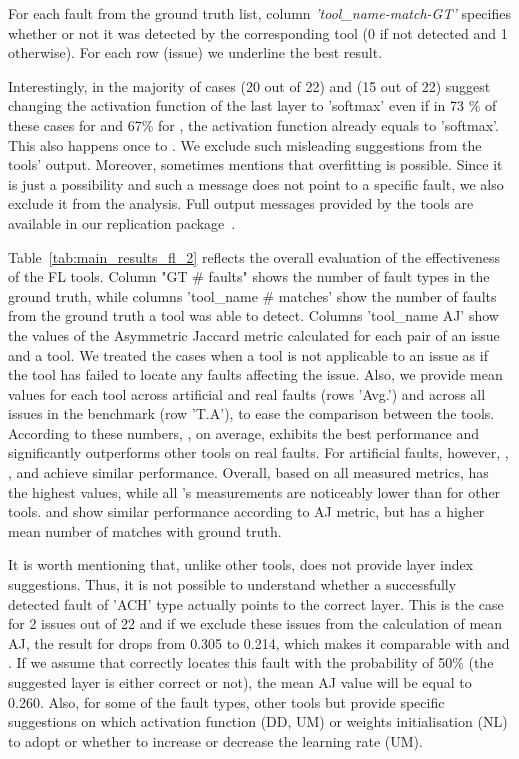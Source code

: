 For each fault from the ground truth list, column \textit{'tool\_name-match-GT'} specifies whether or not it was detected by the corresponding tool (0 if not detected and 1 otherwise). For each row (issue) we underline the best result.

Interestingly, in the majority of cases \UM (20 out of 22) and \DD (15 out of 22) suggest changing the activation function of the last layer to 'softmax' even if in 73 \% of these cases for \UM and 67\% for \DD, the activation function already equals to 'softmax'. This also happens once to \NL. We exclude such misleading suggestions from the tools' output. Moreover, sometimes \UM mentions that overfitting is possible. Since it is just a possibility and such a message does not point to a specific fault, we also exclude it from the analysis. Full output messages provided by the tools are available in our replication package~\cite{fl_comparison_replication}.

Table~\ref{tab:main_results_fl_2} reflects the overall evaluation of the effectiveness of the FL tools. Column "GT \# faults" shows the number of fault types in the ground truth, while columns 'tool\_name \# matches' show the number of faults from the ground truth a tool was able to detect. Columns 'tool\_name AJ' show the values of the Asymmetric Jaccard metric calculated for each pair of an issue and a tool. We treated the cases when a tool is not applicable to an issue as if the tool has failed to locate any faults affecting the issue. Also, we provide mean values for each tool across artificial and real faults (rows 'Avg.') and across all issues in the benchmark (row 'T.A'), to ease the comparison between the tools. According to these numbers, \dfd, on average, exhibits the best performance and significantly outperforms other tools on real faults. For artificial faults, however, \dfd, \NL, and \UM achieve similar performance. Overall, based on all measured metrics, \dfd has the highest values, while all \DD's measurements are noticeably lower than for other tools. \NL and \UM show similar performance according to AJ metric, but \NL has a higher mean number of matches with ground truth. 


It is worth mentioning that, unlike other tools, \dfd does not provide layer index suggestions. Thus, it is not possible to understand whether a successfully detected fault of 'ACH' type actually points to the correct layer. This is the case for 2 issues out of 22 and if we exclude these issues from the calculation of mean AJ, the result for \dfd drops from 0.305 to 0.214, which makes it comparable with \NL and \UM. If we assume that \dfd correctly locates this fault with the probability of 50\% (the suggested layer is either correct or not), the mean AJ value will be equal to 0.260. Also, for some of the fault types, other tools but \dfd provide specific suggestions on which activation function (DD, UM) or weights initialisation (NL) to adopt or whether to increase or decrease the learning rate (UM).



